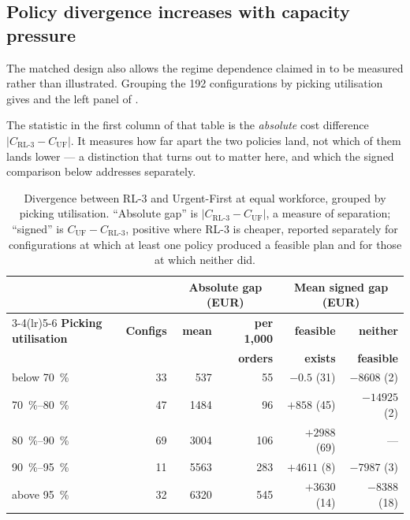 \subsection{Policy divergence increases with capacity pressure}
\label{sec:res-pressure-bands}

The matched design also allows the regime dependence claimed in  to be
measured rather than illustrated. Grouping the 192 configurations by picking utilisation gives
 and the left panel of .

The statistic in the first column of that table is the \emph{absolute} cost difference
\(\lvert C_{\text{RL-3}} - C_{\text{UF}}\rvert\). It measures how far apart the two policies
land, not which of them lands lower --- a distinction that turns out to matter here, and which
the signed comparison below addresses separately.

\begin{table}[htbp]
\centering
\caption[Policy divergence by capacity-pressure band]{Divergence between RL-3 and Urgent-First
at equal workforce, grouped by picking utilisation. ``Absolute gap'' is
\(\lvert C_{\text{RL-3}} - C_{\text{UF}}\rvert\), a measure of separation; ``signed'' is
\(C_{\text{UF}} - C_{\text{RL-3}}\), positive where RL-3 is cheaper, reported separately for
configurations at which at least one policy produced a feasible plan and for those at which
neither did.}
\label{tab:pressure-bands}
\small
\setlength{\tabcolsep}{4.5pt}
\begin{tabular}{lrrrrr}
\toprule
& & \multicolumn{2}{c}{\textbf{Absolute gap (EUR)}} &
\multicolumn{2}{c}{\textbf{Mean signed gap (EUR)}} \\
\cmidrule(lr){3-4}\cmidrule(lr){5-6}
\textbf{Picking utilisation} & \textbf{Configs} & \textbf{mean} & \textbf{per 1{,}000}
& \textbf{feasible} & \textbf{neither} \\
 & & & \textbf{orders} & \textbf{exists} & \textbf{feasible} \\
\midrule
below \SI{70}{\percent}      & 33 & 537        & 55  & $-0.5$ (31)   & $-\num{8608}$ (2) \\
\SIrange{70}{80}{\percent}   & 47 & \num{1484} & 96  & $+858$ (45)   & $-\num{14925}$ (2) \\
\SIrange{80}{90}{\percent}   & 69 & \num{3004} & 106 & $+\num{2988}$ (69) & --- \\
\SIrange{90}{95}{\percent}   & 11 & \num{5563} & 283 & $+\num{4611}$ (8)  & $-\num{7987}$ (3) \\
above \SI{95}{\percent}      & 32 & \num{6320} & 545 & $+\num{3630}$ (14) & $-\num{8388}$ (18) \\
\bottomrule
\end{tabular}
\end{table}

